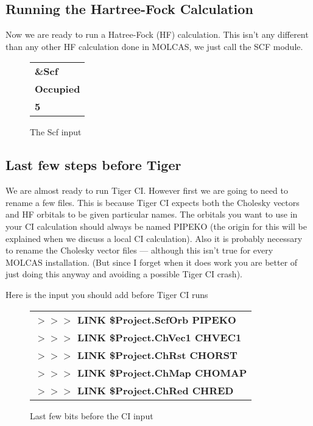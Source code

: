 \documentclass{article}
\begin{document}
\subsection{Running the Hartree-Fock Calculation}
Now we are ready to run a Hatree-Fock (HF) calculation. This isn't any different than any other HF calculation done in MOLCAS, we just call the SCF module. 

\begin{figure}[h!]
	\begin{tabular}{l}
		\textbf{\&Scf} \\
		\textbf{Occupied} \\
		\textbf{5} \\
	\end{tabular}
	\centering
	\caption{The Scf input}
\end{figure}


\subsection{Last few steps before Tiger}
We are almost ready to run Tiger CI. However first we are going to need to rename a few files. This is because Tiger CI expects both the Cholesky vectors and HF orbitals to be given particular names. The orbitals you want to use in your CI calculation should always be named PIPEKO  (the origin for this will be explained when we discuss a local CI calculation). Also it is probably necessary to rename the Cholesky vector files --- although this isn't true for every MOLCAS installation. (But since I forget when it does work you are better of just doing this anyway and avoiding a possible Tiger CI crash). 

Here is the input you should add before Tiger CI runs

\begin{figure}[h!]
	\begin{tabular}{l}
		\textbf{$>>>$ LINK \$Project.ScfOrb PIPEKO} \\
		\textbf{$>>>$ LINK \$Project.ChVec1 CHVEC1} \\
		\textbf{$>>>$ LINK \$Project.ChRst CHORST} \\
		\textbf{$>>>$ LINK \$Project.ChMap CHOMAP} \\
		\textbf{$>>>$ LINK \$Project.ChRed CHRED} \\
	\end{tabular}
	\centering
	\caption{Last few bits before the CI input}
\end{figure}
\end{document}
